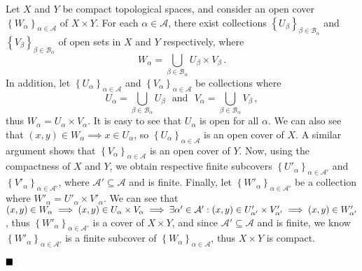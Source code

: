 \documentclass[12pt]{article}
\newcommand{\mc}[1]{\mathcal{#1}}
\newcommand{\sptext}[1]{
    \ensuremath{\ \ \ \text{#1}\ \ \ }
}
\newcommand{\done}{
    \ensuremath{\strut\hfill\blacksquare}
}
\newcommand{\braces}[1]{\left\{#1\right\}}           %
\begin{document}
\pagestyle{fancy}
\fancyhead{}

\normalsize

Let $X$ and $Y$ be compact topological spaces, and consider an open cover
$\braces{W_\alpha}_{\alpha \in \mathcal{A}}$ of $X \times Y$.
For each $\alpha \in \mathcal{A}$, there exist collections
$\braces{U_\beta}_{\beta \in \mathcal{B}_\alpha}$ and
$\braces{V_\beta}_{\beta \in \mathcal{B}_\alpha}$ of open sets in $X$ and $Y$
respectively, where
\[
	W_\alpha =
	\bigcup_{\beta \in \mathcal{B}_\alpha}U_\beta \times V_\beta
	\, .
\]
In addition, let $\braces{U_\alpha}_{\alpha \in \mathcal{A}}$ and
$\braces{V_\alpha}_{\alpha \in \mathcal{A}}$ be collections where
\[
	U_\alpha=\bigcup_{\beta \in \mathcal{B}_\alpha}U_\beta
	\sptext{and}
	V_\alpha=\bigcup_{\beta \in \mathcal{B}_\alpha}V_\beta
	\, ,
\]
thus $W_\alpha=U_\alpha \times V_\alpha$.
It is easy to see that $U_\alpha$ is open for all $\alpha$.
We can also see that $(x,y)\in W_\alpha\implies x\in U_\alpha$, so
$\braces{U_\alpha}_{\alpha \in \mathcal{A}}$ is an open cover of $X$.
A similar argument shows that $\braces{V_\alpha}_{\alpha \in \mathcal{A}}$ is
an open cover of $Y$.
Now, using the compactness of $X$ and $Y$,
we obtain respective finite subcovers
$\braces{U'_\alpha}_{\alpha \in \mathcal{A}'}$ and
$\braces{V'_\alpha}_{\alpha \in \mathcal{A}'}$, where
$\mathcal{A}' \subseteq \mathcal{A}$ and is finite.
Finally, let $\braces{W'_\alpha}_{\alpha \in \mathcal{A}'}$ be a collection where
$W'_\alpha = U'_\alpha \times V'_\alpha$.
We can see that $(x,y) \in W_\alpha
    \implies (x,y) \in U_\alpha \times V_\alpha \break
    \implies \exists \alpha' \in \mathcal{A}' :
    (x,y) \in U'_{\alpha'} \times V'_{\alpha'}
    \implies (x,y) \in W'_{\alpha'}$, thus
$\braces{W'_\alpha}_{\alpha \in \mathcal{A}'}$ is a cover of $X \times Y$,
and since $\mc A' \subseteq \mc A$ and is finite, we know
$\braces{W'_\alpha}_{\alpha \in \mathcal{A}'}$ is a finite subcover of
$\braces{W_\alpha}_{\alpha \in \mathcal{A}}$, thus $X \times Y$ is compact.
\done
\end{document}
